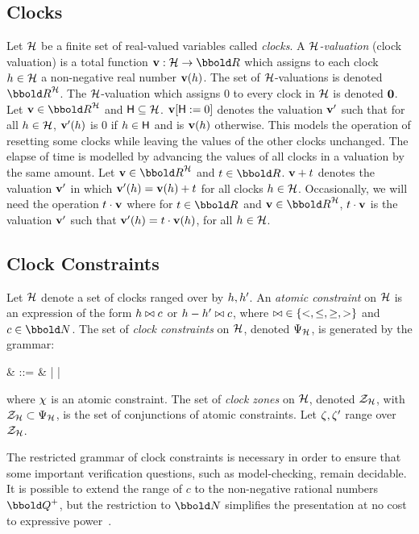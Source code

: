 {\subsection{Clocks}\label{ss:mscclocks}
Let $\clocks$ be a finite set of real-valued variables called
\emph{clocks}.  A \emph{$\clocks$-valuation} (clock valuation) is a 
total function $\clkvl : \clocks \fun \Time$ which assigns to each
clock $\clock \in \clocks$ a non-negative real number
$\mathbf{v}(h)$.  The set of $\clocks$-valuations is denoted
$\clkvls$. The $\clocks$-valuation which assigns $0$ to every clock in
$\clocks$ is denoted $\mathbf{0}$.  Let $\clkvl \in \clkvls$ and
$\someclks \subseteq \clocks$.  $\mathbf{v}[{\sf H}:=0]$ denotes the
valuation $\mathbf{v}'$ such that for all $\clock \in \clocks$,
$\mathbf{v}'(h)$ is $0$ if $h
\in {\sf H}$ and is $\mathbf{v}(h)$ otherwise. This models the operation of
resetting some clocks while leaving the values of the other clocks
unchanged. The elapse of time is modelled by advancing the values of
all clocks in a valuation by the same amount. Let $\clkvl
\in \clkvls$ and $t \in \Time$. $\mathbf{v} + t$ denotes the valuation $\mathbf{v}'$
in which $\mathbf{v}'(h) = \mathbf{v}(h) + t$ for all clocks $\clock
\in \clocks$. Occasionally, we will need the operation $t \cdot \mathbf{v}$
where for $t \in \Time$ and $\clkvl \in \clkvls$, $t \cdot \mathbf{v}$ is
the valuation $\mathbf{v}'$ such that $\mathbf{v}'(h) = t \cdot \mathbf{v}(h)$,
for all $\clock \in \clocks$.


\subsection{Clock Constraints}\label{ss:mscclockconstraints}
Let $\clocks$ denote a set of clocks ranged over by $h, h'$.
An \emph{atomic constraint} on $\clocks$ is an expression of the form
$h \bowtie c$ or $h - h' \bowtie c$, where $\bowtie\; \in
\{<,\leq,\geq,>\}$ and $c \in \nat$. 
The set of \emph{clock constraints} on $\clocks$, denoted $\ClockConstraints$,
is generated by the grammar:
\begin{syntax}
\clkcond & ::= & \atomcond | \clkcond \land \clkcond | \lnot \clkcond
\end{syntax}
where ${\chi}$ is an atomic constraint.  The set of \emph{clock
zones} on $\clocks$, denoted $\ClockZones$, with $\ClockZones \subset
\ClockConstraints$, is the set of conjunctions of atomic
constraints. Let ${\zeta}, {\zeta}'$ range over $\ClockZones$.

The restricted grammar of clock constraints is necessary in order to
ensure that some important verification questions, such as
model-checking, remain decidable. It is possible to extend the range
of $c$ to the non-negative rational numbers $\rat^+$, but the
restriction to $\nat$ simplifies the presentation at no cost to
expressive power~\cite{ad:94}.
  
}
